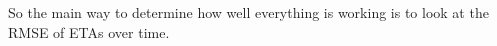 So the main way to determine how well everything is working is to look 
at the RMSE of ETAs over time.






